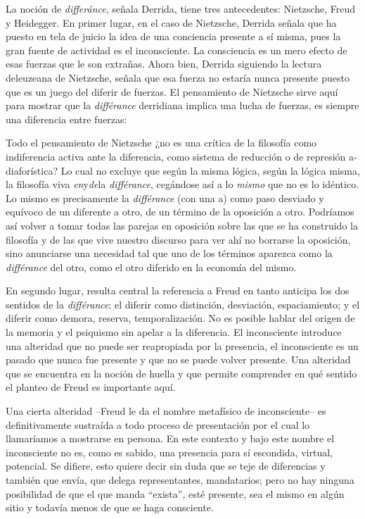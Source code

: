 La noción de \emph{differánce}, señala Derrida, tiene tres antecedentes: Nietzsche, Freud y Heidegger. En primer lugar, en el caso de Nietzsche, Derrida señala que ha puesto en tela de juicio la idea de una conciencia presente a sí misma, pues la gran fuente de actividad es el inconsciente. La consciencia es un mero efecto de esas fuerzas que le son extrañas. Ahora bien, Derrida siguiendo la lectura deleuzeana de Nietzsche, señala que esa fuerza no estaría nunca presente puesto que es un juego del diferir de fuerzas. El pensamiento de Nietzsche sirve aquí para mostrar que la \emph{différance} derridiana implica una lucha de fuerzas, es siempre una diferencia entre fuerzas:

Todo el pensamiento de Nietzsche ¿no es una crítica de la filosofía como indiferencia activa ante la diferencia, como sistema de reducción o de represión a-diaforística? Lo cual no excluye que según la misma lógica, según la lógica misma, la filosofía viva \emph{en}y\emph{de}la \emph{différance}, cegándose así a lo \emph{mismo} que no es lo idéntico. Lo mismo es precisamente la \emph{différance} (con una a) como paso desviado y equívoco de un diferente a otro, de un término de la oposición a otro. Podríamos así volver a tomar todas las parejas en oposición sobre las que se ha construido la filosofía y de las que vive nuestro discurso para ver ahí no borrarse la oposición, sino anunciarse una necesidad tal que uno de los términos aparezca como la \emph{différance} del otro, como el otro diferido en la economía del mismo.

En segundo lugar, resulta central la referencia a Freud en tanto anticipa los dos sentidos de la \emph{différance}: el diferir como distinción, desviación, espaciamiento; y el diferir como demora, reserva, temporalización. No es posible hablar del origen de la memoria y el psiquismo sin apelar a la diferencia. El inconsciente introduce una alteridad que no puede ser reapropiada por la presencia, el inconsciente es un pasado que nunca fue presente y que no se puede volver presente. Una alteridad que se encuentra en la noción de huella y que permite comprender en qué sentido el planteo de Freud es importante aquí.

Una cierta alteridad --Freud le da el nombre metafísico de inconsciente-- es definitivamente sustraída a todo proceso de presentación por el cual lo llamaríamos a mostrarse en persona. En este contexto y bajo este nombre el inconsciente no es, como es sabido, una presencia para sí escondida, virtual, potencial. Se difiere, esto quiere decir sin duda que se teje de diferencias y también que envía, que delega representantes, mandatarios; pero no hay ninguna posibilidad de que el que manda ``exista'', esté presente, sea el mismo en algún sitio y todavía menos de que se haga consciente.


